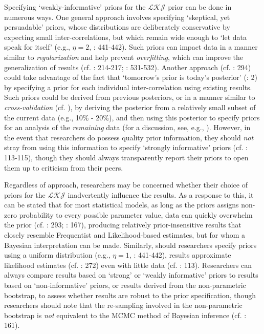 \documentclass[
  10pt,
  a4paper,
  twoside]{article}
\begin{document}
Specifying `weakly-informative' priors for the \(\mathcal{LKJ}\) prior can be done in numerous ways. One general approach involves specifying `skeptical, yet persuadable' priors, whose distributions are deliberately conservative by expecting small inter-correlations, but which remain wide enough to `let data speak for itself' (e.g., \(\eta = 2\), : 441-442). Such priors can impact data in a manner similar to \emph{regularization} and help prevent \emph{overfitting}, which can improve the generalization of results (cf. : 214-217; : 531-532). Another approach (cf. : 294) could take advantage of the fact that `tomorrow's prior is today's posterior' (: 2) by specifying a prior for each individual inter-correlation using existing results. Such priors could be derived from previous posteriors, or in a manner similar to \emph{cross-validation} (cf. ), by deriving the posterior from a relatively small subset of the current data (e.g., 10\% - 20\%), and then using this posterior to specify priors for an analysis of the \emph{remaining} data (for a discussion, see, e.g., ). However, in the event that researchers do possess quality prior information, they should \emph{not} stray from using this information to specify `strongly informative' priors (cf. : 113-115), though they should always transparently report their priors to open them up to criticism from their peers.

Regardless of approach, researchers may be concerned whether their choice of priors for the \(\mathcal{LKJ}\) inadvertently influence the results. As a response to this, it can be stated that for most statistical models, as long as the priors assigns non-zero probability to every possible parameter value, data can quickly overwhelm the prior (cf. : 293; : 167), producing relatively prior-insensitive results that closely resemble Frequentist and Likelihood-based estimates, but for whom a Bayesian interpretation can be made. Similarly, should researchers specify priors using a uniform distribution (e.g., \(\eta = 1\), : 441-442), results approximate likelihood estimates (cf. : 272) even with little data (cf. : 113). Researchers can always compare results based on `strong' or `weakly informative' priors to results based on `non-informative' priors, or results derived from the non-parametric bootstrap, to assess whether results are robust to the prior specification, though researchers should note that the re-sampling involved in the non-parametric bootstrap is \emph{not} equivalent to the MCMC method of Bayesian inference (cf. : 161).
\end{document}
